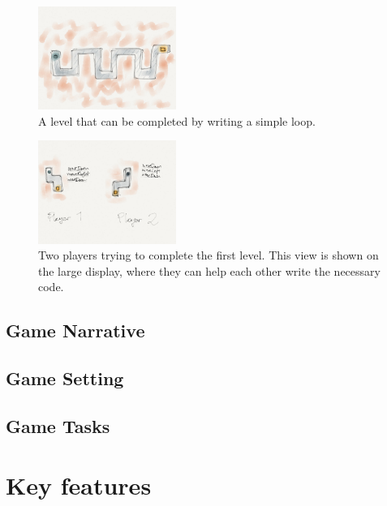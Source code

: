 \documentclass[12pt,journal,compsoc]{IEEEtran}
\begin{document}
\begin{figure}[htb]
    \begin{centering}
    \includegraphics[width=0.4\textwidth]{./figures/codelab4.jpg}
    \caption{A level that can be completed by writing a simple loop.} 
    \label{fig:loop}
    \end{centering} 
\end{figure}

\begin{figure}[htb]
    \begin{centering}
    \includegraphics[width=0.4\textwidth]{./figures/codelab5.jpg}
    \caption{Two players trying to complete the first level. This view is shown
    on the large display, where they can help each other write the necessary
    code. } 
    \label{fig:loop}
    \end{centering} 
\end{figure}




\subsection{Game Narrative} 


\subsection{Game Setting} 
\subsection{Game Tasks} 

\section{Key features} 
\end{document}
